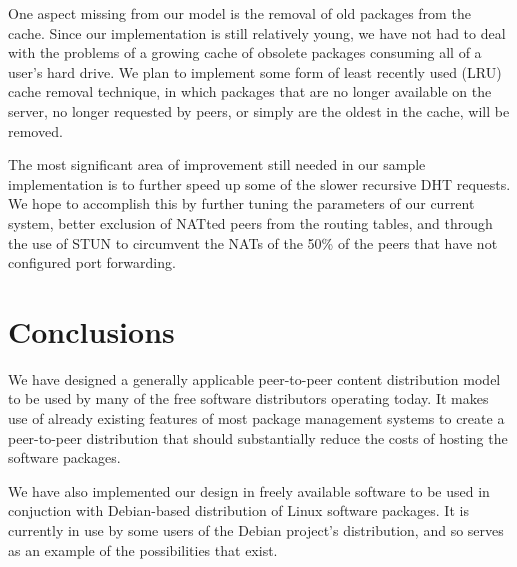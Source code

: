 \documentclass[conference]{IEEEtran}
\begin{document}
One aspect missing from our model is the removal of old packages
from the cache. Since our implementation is still relatively young,
we have not had to deal with the problems of a growing cache of
obsolete packages consuming all of a user's hard drive. We plan to
implement some form of least recently used (LRU) cache removal
technique, in which packages that are no longer available on the
server, no longer requested by peers, or simply are the oldest in
the cache, will be removed.

The most significant area of improvement still needed in our sample
implementation is to further speed up some of the slower recursive
DHT requests. We hope to accomplish this by further tuning the
parameters of our current system, better exclusion of NATted peers
from the routing tables, and through the use of STUN \cite{STUN} to
circumvent the NATs of the 50\% of the peers that have not
configured port forwarding.


\section{Conclusions}
\label{conclusions}

We have designed a generally applicable peer-to-peer content
distribution model to be used by many of the free software
distributors operating today. It makes use of already existing
features of most package management systems to create a
peer-to-peer distribution that should substantially reduce the costs
of hosting the software packages.

We have also implemented our design in freely available software to
be used in conjuction with Debian-based distribution of Linux
software packages. It is currently in use by some users of the
Debian project's distribution, and so serves as an example of the
possibilities that exist.



\end{document}
